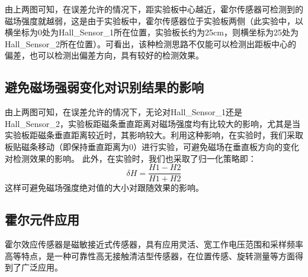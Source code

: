 \begin{figure}[htbp]
\centering

%
%

\centering
\label{fig:2.2}
\end{figure}

\par{由上两图可知，在误差允许的情况下，距实验板中心越近，霍尔传感器可检测到的磁场强度就越弱，这是由于实验板中，霍尔传感器位于实验板两侧（此实验中，以横坐标为0处为Hall\_Sensor\_1所在位置，实验板长约为25cm，则横坐标为25处为Hall\_Sensor\_2所在位置）。可看出，该种检测思路不仅能可以检测出距板中心的偏差，也可以检测出偏差方向，具有较好的检测效果。}

\subsection{避免磁场强弱变化对识别结果的影响}
\par{由上两图可知，在误差允许的情况下，无论对Hall\_Sensor\_1还是Hall\_Sensor\_2，实验板距磁条垂直距离对磁场强度均有比较大的影响，尤其是当实验板距磁条垂直距离较近时，其影响较大。利用这种影响，在实验时，我们采取板贴磁条移动（即保持垂直距离为0）进行实验，可避免磁场在垂直板方向的变化对检测效果的影响。
此外，在实验时，我们也采取了归一化策略即：$$ \delta H = \frac{H1-H2}{H1+H2} $$这样可避免磁场强度绝对值的大小对跟随效果的影响。}

\subsection{霍尔元件应用}
\par{霍尔效应传感器是磁敏接近式传感器，具有应用灵活、宽工作电压范围和采样频率高等特点，是一种可靠性高无接触清洁型传感器，在位置传感、旋转测量等方面得到了广泛应用。}

